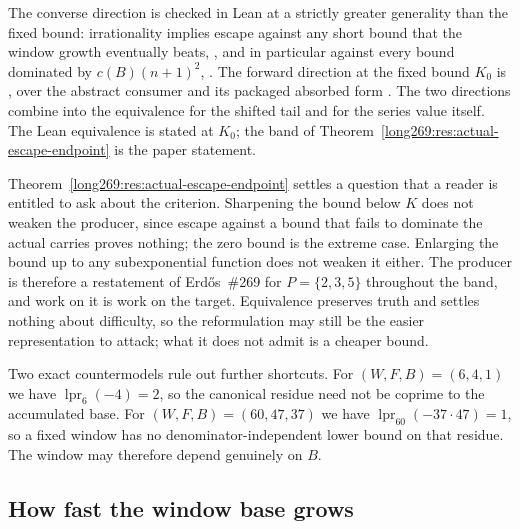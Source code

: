 \documentclass[11pt]{article}
\newcommand{\lpr}{\operatorname{lpr}}
\begin{document}
\noindent The converse direction is checked in Lean at a strictly greater
generality than the fixed bound: irrationality implies escape against any short
bound that the window growth eventually beats,
,
and in particular against every bound dominated by $c(B)(n+1)^{2}$,
.
The forward direction at the fixed bound $K_0$ is
,
over the abstract consumer
and its packaged absorbed form
.
The two directions combine into the equivalence
for the shifted tail and
for the series value itself.  The Lean equivalence is stated at $K_0$; the band
of Theorem~\ref{long269:res:actual-escape-endpoint} is the paper statement.

Theorem~\ref{long269:res:actual-escape-endpoint} settles a question that a reader is
entitled to ask about the criterion.  Sharpening the bound below $K$ does not
weaken the producer, since escape against a bound that fails to dominate the
actual carries proves nothing; the zero bound is the extreme case.  Enlarging
the bound up to any subexponential function does not weaken it either.  The
producer is therefore a restatement of Erd\H{o}s~\#269 for $P=\{2,3,5\}$
throughout the band, and work on it is work on the target.  Equivalence
preserves truth and settles nothing about difficulty, so the reformulation may
still be the easier representation to attack; what it does not admit is a
cheaper bound.

Two exact countermodels rule out further shortcuts.  For $(W,F,B)=(6,4,1)$ we
have $\lpr_6(-4)=2$, so the canonical residue need not be coprime to the
accumulated base.  For $(W,F,B)=(60,47,37)$ we have
$\lpr_{60}(-37\cdot47)=1$, so a fixed window has no denominator-independent
lower bound on that residue.  The window may therefore depend genuinely on $B$.

\subsection{How fast the window base grows}
\end{document}
